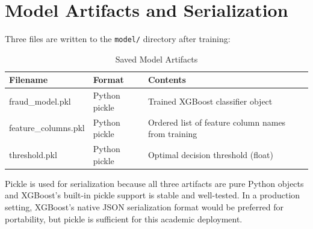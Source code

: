 \section{Model Artifacts and Serialization}

Three files are written to the \texttt{model/} directory after training:

\begin{table}[H]
\centering
\caption{Saved Model Artifacts}
\label{tab:artifacts}
\begin{tabular}{|l|l|p{5.5cm}|}
\hline
\textbf{Filename} & \textbf{Format} & \textbf{Contents}\\
\hline
fraud\_model.pkl & Python pickle & Trained XGBoost classifier object\\
\hline
feature\_columns.pkl & Python pickle & Ordered list of feature column names from training\\
\hline
threshold.pkl & Python pickle & Optimal decision threshold (float)\\
\hline
\end{tabular}
\end{table}

Pickle is used for serialization because all three artifacts are pure Python objects and XGBoost's built-in pickle support is stable and well-tested. In a production setting, XGBoost's native JSON serialization format would be preferred for portability, but pickle is sufficient for this academic deployment.
